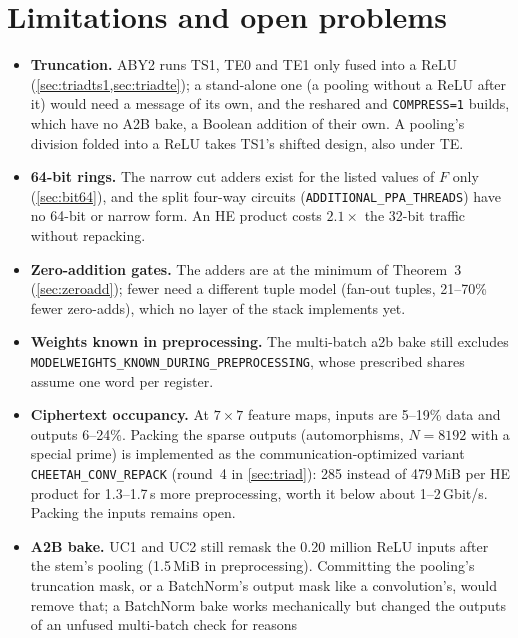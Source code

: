 \documentclass[10pt,a4paper]{article}
\newcommand{\flag}[1]{\nolinkurl{#1}}
\newcommand{\s}{\,s\xspace}
\begin{document}
\FloatBarrier



\FloatBarrier
\section{Limitations and open problems}\label{sec:limits}

\begin{itemize}\itemsep1pt
\item \textbf{Truncation.} ABY2 runs TS1, TE0 and TE1 only fused into a ReLU (\cref{sec:triadts1,sec:triadte}); a
  stand-alone one (a pooling without a ReLU after it) would need a message of its own, and the reshared and
  \flag{COMPRESS=1} builds, which have no A2B bake, a Boolean addition of their own. A pooling's division folded into a
  ReLU takes TS1's shifted design, also under TE.
\item \textbf{64-bit rings.} The narrow cut adders exist for the listed values of $F$ only (\cref{sec:bit64}), and the
  split four-way circuits (\flag{ADDITIONAL_PPA_THREADS}) have no 64-bit or narrow form. An HE product costs $2.1\times$ the
  32-bit traffic without repacking.
\item \textbf{Zero-addition gates.} The adders are at the minimum of Theorem~3 (\cref{sec:zeroadd}); fewer need a different
  tuple model (fan-out tuples, 21--70\% fewer zero-adds), which no layer of the stack implements yet.
\item \textbf{Weights known in preprocessing.} The multi-batch a2b bake still excludes
  \flag{MODELWEIGHTS_KNOWN_DURING_PREPROCESSING}, whose prescribed shares assume one word per register.
\item \textbf{Ciphertext occupancy.} At $7\times7$ feature maps, inputs are 5--19\% data and outputs
  6--24\%. Packing the sparse outputs (automorphisms, $N = 8192$ with a special prime) is implemented as the
  communication-optimized variant \flag{CHEETAH_CONV_REPACK} (round~4 in \cref{sec:triad}): 285 instead of 479\,MiB per HE
  product for 1.3--1.7\s more preprocessing, worth it below about 1--2\,Gbit/s. Packing the inputs remains open.
\item \textbf{A2B bake.} UC1 and UC2 still remask the 0.20 million ReLU inputs after the stem's pooling (1.5\,MiB in
  preprocessing). Committing the pooling's truncation mask, or a BatchNorm's output mask like a convolution's, would
  remove that; a BatchNorm bake works mechanically but changed the outputs of an unfused multi-batch check for reasons

\end{itemize}
\end{document}
